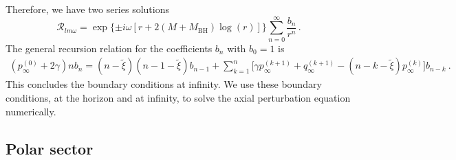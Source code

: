 \documentclass[11pt]{article}
\begin{document}
Therefore, we have two series solutions
\begin{equation}
\mathcal{R}_{lm\omega}=\exp \{\pm i \omega [r +2(M+M_{\textrm{BH}}) \log(r)]\} \displaystyle 
\sum_{n=0}^{\infty}\frac{b_n}{r^n} \,.
\label{eq:BCInf}
\end{equation}
The general recursion relation for the coefficients $b_n$ with $b_0=1$ is
\begin{align}
(p_\infty^{(0)} + 2 \gamma) n b_n = (n - \tilde{\xi})(n-1 -\tilde{\xi})b_{n-1} 
+\displaystyle \sum_{k=1}^{n}\Big[\gamma p_\infty^{(k+1)}+q_\infty^{(k+1)} - (n-k-\tilde{\xi})p_\infty^{(k)}\Big]b_{n-k}\ .
\end{align}
This concludes the boundary conditions at infinity. We use these boundary conditions, at the horizon and at infinity, to solve the axial perturbation equation numerically.


\subsection{Polar sector}
\end{document}
